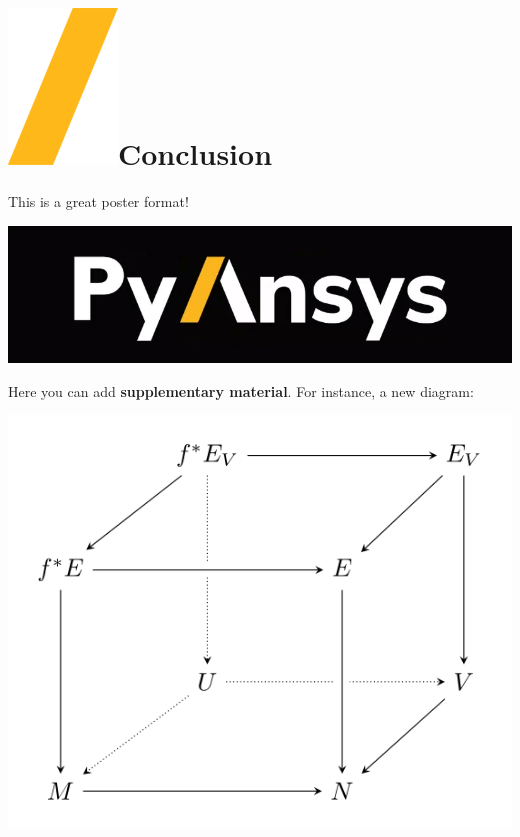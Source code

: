 \documentclass[a0paper,fleqn]{src/betterposter}
\begin{document}
{\section{\includegraphics[height=\fontcharht\font`\S]{img/general/slash.png}Conclusion}
This is a great poster format!

\vfill

\includegraphics[width=\textwidth]{img/general/pyansys_dark}\\

}{

Here you can add \textbf{supplementary material}. For instance, a new diagram:
\begin{center}
\includegraphics[width=\textwidth]{img/example/tikzexample2}
\end{center}

}
\end{document}
